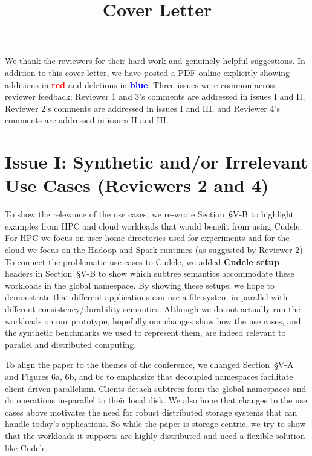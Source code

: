 \documentclass[onecolumn,conference]{IEEEtran}
\begin{document}
\title{Cover Letter}
\maketitle

We thank the reviewers for their hard work and genuinely helpful suggestions.
In addition to this cover letter, we have posted a PDF online explicitly
showing additions in \textcolor{red}{\textbf{red}} and deletions in
\textcolor{blue}{\textbf{blue}}. Three issues were common across reviewer
feedback; Reviewer 1 and 3's comments are addressed in issues I and II,
Reviewer 2's comments are addressed in issues I and III, and Reviewer 4's
comments are addressed in issues II and III. 

\section*{Issue I: Synthetic and/or Irrelevant Use Cases (Reviewers 2 and 4)}

To show the relevance of the use cases, we re-wrote Section~{\S}V-B to
highlight examples from HPC and cloud workloads that would benefit from using
Cudele. For HPC we focus on user home directories used for experiments and for
the cloud we focus on the Hadoop and Spark runtimes (as suggested by Reviewer
2). To connect the problematic use cases to Cudele, we added \textbf{Cudele
setup} headers in Section~{\S}V-B to show which subtree semantics accommodate
these workloads in the global namespace.  By showing these setups, we hope to
demonstrate that different applications can use a file system in parallel with
different consistency/durability semantics.  Although we do not actually run
the workloads on our prototype, hopefully our changes show how the use cases,
and the synthetic benchmarks we used to represent them, are indeed relevant to
parallel and distributed computing.

To align the paper to the themes of the conference, we changed Section~{\S}V-A
and Figures 6a, 6b, and 6c to emphasize that decoupled namespaces facilitate
client-driven parallelism. Clients detach subtrees form the global namespaces
and do operations in-parallel to their local disk. We also hope that changes to
the use cases above motivates the need for robust distributed storage systems
that can handle today's applications.  So while the paper is storage-centric,
we try to show that the workloads it supports are highly distributed and need a
flexible solution like Cudele.  
\end{document}
